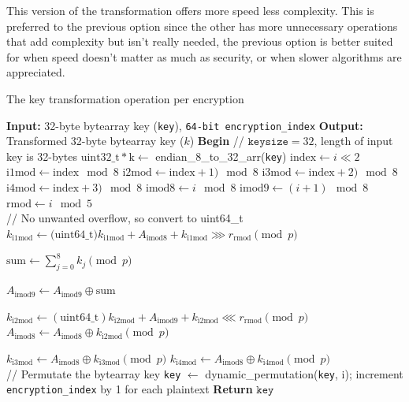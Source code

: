 \documentclass[fleqn, a4paper,12pt]{article}
\newcommand{\COMMENT}[1]{\State \textcolor[HTML]{003e57}{// #1}}
\begin{document}
This version of the transformation offers more speed less complexity. This is preferred to the previous option since the other has more unnecessary operations that add complexity but isn't really needed, the previous option is better suited for when speed doesn't matter as much as security, or when slower algorithms are appreciated.

\begin{algorithm}[H] %
\caption{The key transformation operation per encryption}
\begin{algorithmic}[1]  %
\State \textbf{Input:} 32-byte bytearray key (\texttt{key}), \texttt{64-bit encryption\_index}
\State \textbf{Output:} Transformed 32-byte bytearray key ($k$)
\State \textbf{Begin}
\COMMENT{$\texttt{keysize} = 32$, length of input key is 32-bytes}
\State $\mathrm{uint32\_t *k} \gets$ endian\_8\_to\_32\_arr(\texttt{key})
	\State $\mathrm{index} \gets i \ll 2$
	\State $\mathrm{i1mod} \gets \mathrm{index} \mod 8$
	\State $\mathrm{i2mod} \gets \mathrm{index}+1) \mod 8$
	\State $\mathrm{i3mod} \gets \mathrm{index}+2) \mod 8$
	\State $\mathrm{i4mod} \gets \mathrm{index}+3) \mod 8$
	\State $\mathrm{imod8} \gets i \mod 8$
	\State $\mathrm{imod9} \gets (i+1) \mod 8$
	\State $\mathrm{rmod} \gets i \mod 5$ \\

	\COMMENT{No unwanted overflow, so convert to uint64\_t}
	\State $k_\mathrm{i1mod} \gets \text{(uint64\_t)} k_\mathrm{i1mod} + A_\mathrm{imod8} + k_\mathrm{i1mod} \ggg r_\mathrm{rmod}  \pmod p $

	\State $ \mathrm{sum} \gets \displaystyle \sum_{j=0}^8 k_j \pmod p $

	\State $A_\mathrm{imod9} \gets A_\mathrm{imod9} \oplus \mathrm{sum}$

	\State $k_\mathrm{i2mod} \gets \mathrm{(uint64\_t)} k_\mathrm{i2mod} + A_\mathrm{imod9} + k_\mathrm{i2mod} \lll r_\mathrm{rmod} \pmod p$
	\State $A_\mathrm{imod8} \gets A_\mathrm{imod8} \oplus k_\mathrm{i2mod} \pmod p$

	\State $k_\mathrm{i3mod} \gets A_\mathrm{imod8} \oplus k_\mathrm{i3mod} \pmod p$
	\State $k_\mathrm{i4mod} \gets A_\mathrm{imod8} \oplus k_\mathrm{i4mod} \pmod p$ \\

	\COMMENT{Permutate the bytearray key}
	\State \texttt{key} $\gets$ dynamic\_permutation(\texttt{key}, i);
\EndFor
\State increment \texttt{encryption\_index} by 1 for each plaintext
\State \textbf{Return} $\texttt{key}$
\end{algorithmic}
\end{algorithm}
\end{document}
